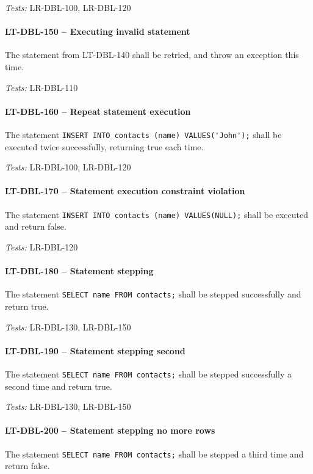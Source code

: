 \textit{Tests: } LR-DBL-100, LR-DBL-120

\paragraph{LT-DBL-150 -- Executing invalid statement}
The statement from LT-DBL-140 shall be retried, and throw an exception
this time.

\textit{Tests: } LR-DBL-110

\paragraph{LT-DBL-160 -- Repeat statement execution}
The statement \lstinline{INSERT INTO contacts (name) VALUES('John');}
shall be executed twice successfully, returning true each time.

\textit{Tests: } LR-DBL-100, LR-DBL-120

\paragraph{LT-DBL-170 -- Statement execution constraint violation}
The statement \lstinline{INSERT INTO contacts (name) VALUES(NULL);}
shall be executed and return false.

\textit{Tests: } LR-DBL-120

\paragraph{LT-DBL-180 -- Statement stepping}
The statement \lstinline{SELECT name FROM contacts;} shall be
stepped successfully and return true.

\textit{Tests: } LR-DBL-130, LR-DBL-150

\paragraph{LT-DBL-190 -- Statement stepping second}
The statement \lstinline{SELECT name FROM contacts;} shall
be stepped successfully a second time and return true.

\textit{Tests: } LR-DBL-130, LR-DBL-150

\paragraph{LT-DBL-200 -- Statement stepping no more rows}
The statement \lstinline{SELECT name FROM contacts;} shall
be stepped a third time and return false.

